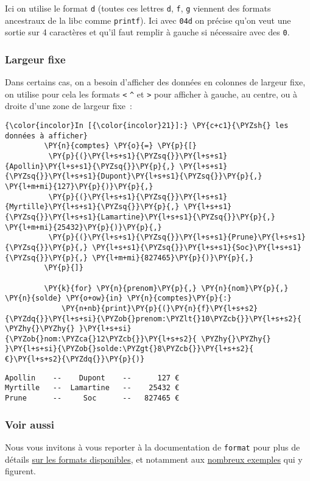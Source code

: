     Ici on utilise le format \texttt{d} (toutes ces lettres \texttt{d},
\texttt{f}, \texttt{g} viennent des formats ancestraux de la libc comme
\texttt{printf}). Ici avec \texttt{04d} on précise qu'on veut une sortie
sur 4 caractères et qu'il faut remplir à gauche si nécessaire avec des
\texttt{0}.

    \hypertarget{largeur-fixe}{%
\subsubsection{Largeur fixe}\label{largeur-fixe}}

    Dans certains cas, on a besoin d'afficher des données en colonnes de
largeur fixe, on utilise pour cela les formats \texttt{\textless{}}
\texttt{\^{}} et \texttt{\textgreater{}} pour afficher à gauche, au
centre, ou à droite d'une zone de largeur fixe~:

    \begin{Verbatim}[commandchars=\\\{\}]
{\color{incolor}In [{\color{incolor}21}]:} \PY{c+c1}{\PYZsh{} les données à afficher}
         \PY{n}{comptes} \PY{o}{=} \PY{p}{[}
          \PY{p}{(}\PY{l+s+s1}{\PYZsq{}}\PY{l+s+s1}{Apollin}\PY{l+s+s1}{\PYZsq{}}\PY{p}{,} \PY{l+s+s1}{\PYZsq{}}\PY{l+s+s1}{Dupont}\PY{l+s+s1}{\PYZsq{}}\PY{p}{,} \PY{l+m+mi}{127}\PY{p}{)}\PY{p}{,}
          \PY{p}{(}\PY{l+s+s1}{\PYZsq{}}\PY{l+s+s1}{Myrtille}\PY{l+s+s1}{\PYZsq{}}\PY{p}{,} \PY{l+s+s1}{\PYZsq{}}\PY{l+s+s1}{Lamartine}\PY{l+s+s1}{\PYZsq{}}\PY{p}{,} \PY{l+m+mi}{25432}\PY{p}{)}\PY{p}{,}
          \PY{p}{(}\PY{l+s+s1}{\PYZsq{}}\PY{l+s+s1}{Prune}\PY{l+s+s1}{\PYZsq{}}\PY{p}{,} \PY{l+s+s1}{\PYZsq{}}\PY{l+s+s1}{Soc}\PY{l+s+s1}{\PYZsq{}}\PY{p}{,} \PY{l+m+mi}{827465}\PY{p}{)}\PY{p}{,}
         \PY{p}{]}
         
         \PY{k}{for} \PY{n}{prenom}\PY{p}{,} \PY{n}{nom}\PY{p}{,} \PY{n}{solde} \PY{o+ow}{in} \PY{n}{comptes}\PY{p}{:}
             \PY{n+nb}{print}\PY{p}{(}\PY{n}{f}\PY{l+s+s2}{\PYZdq{}}\PY{l+s+si}{\PYZob{}prenom:\PYZlt{}10\PYZcb{}}\PY{l+s+s2}{ \PYZhy{}\PYZhy{} }\PY{l+s+si}{\PYZob{}nom:\PYZca{}12\PYZcb{}}\PY{l+s+s2}{ \PYZhy{}\PYZhy{} }\PY{l+s+si}{\PYZob{}solde:\PYZgt{}8\PYZcb{}}\PY{l+s+s2}{ €}\PY{l+s+s2}{\PYZdq{}}\PY{p}{)}
\end{Verbatim}


    \begin{Verbatim}[commandchars=\\\{\}]
Apollin    --    Dupont    --      127 €
Myrtille   --  Lamartine   --    25432 €
Prune      --     Soc      --   827465 €

    \end{Verbatim}

    \hypertarget{voir-aussi}{%
\subsubsection{Voir aussi}\label{voir-aussi}}

    Nous vous invitons à vous reporter à la documentation de \texttt{format}
pour plus de détails
\href{https://docs.python.org/3/library/string.html\#formatstrings}{sur
les formats disponibles}, et notamment aux
\href{https://docs.python.org/3/library/string.html\#format-examples}{nombreux
exemples} qui y figurent.